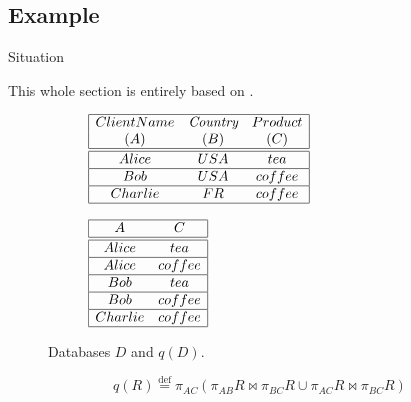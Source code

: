 \documentclass[11pt]{beamer}
\begin{document}
\subsection{Example}
\begin{frame}{Situation}

This whole section is entirely based on \cite{green_provenance_2007}.

	\begin{figure}
	\begin{subfigure}{0.45\textwidth}
        \centering
        $\begin{array}{| c  c  c |}
            \hline
            ClientName & \textit{Country} & Product \\
            (A) & (B) & (C) \\
            \hline 
            \hline
            Alice & USA & tea \\
            \hline
            Bob & USA & coffee \\
            \hline
            Charlie & FR & coffee \\
            \hline
        \end{array}$
      \end{subfigure}
      \begin{subfigure}{0.45\textwidth}
        \centering
        $\begin{array}{| c  c  |}
            \hline
            A & C \\
            \hline 
            \hline
            Alice & tea \\
            \hline
            Alice & coffee  \\
            \hline
            Bob & tea  \\
            \hline
            Bob & coffee  \\
            \hline
            Charlie & coffee  \\
            \hline
        \end{array}$
        \label{fig:calc_bag}
    	\end{subfigure}
        \caption{Databases $D$ and $q(D)$.}
        \label{fig:base_database}
	\end{figure}
	
	$$ q(R) \overset{\mathrm{def}}{=} \pi_{AC}(\pi_{AB} R \Join \pi_{BC} R \cup \pi_{AC} R \Join \pi_{BC} R)$$

\end{frame}
\end{document}
